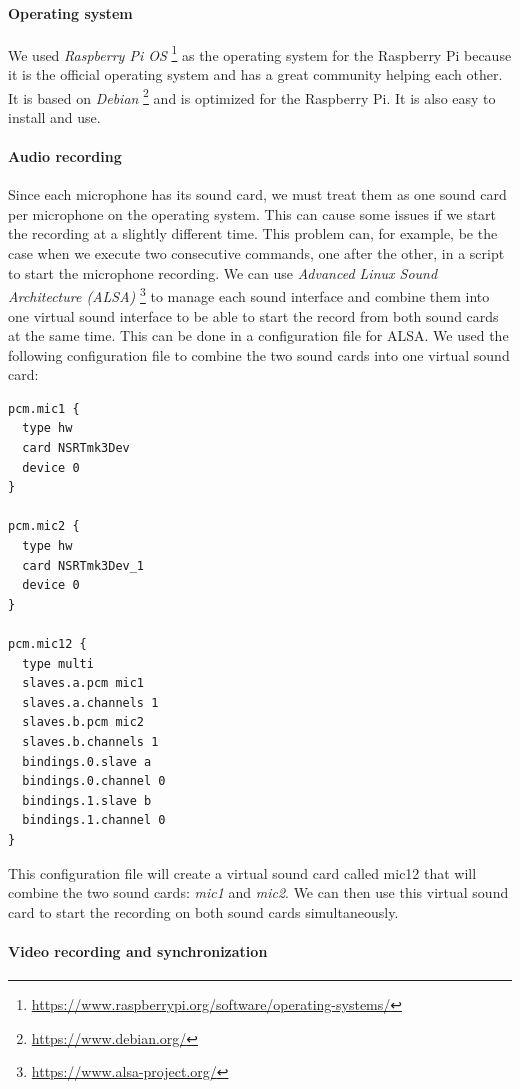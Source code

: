 \paragraph{Operating system}

We used \textit{Raspberry Pi OS} \footnote{\url{https://www.raspberrypi.org/software/operating-systems/}} as the operating system for the Raspberry Pi because it is the official operating system and has a great community helping each other. It is based on \textit{Debian} \footnote{\url{https://www.debian.org/}} and is optimized for the Raspberry Pi. It is also easy to install and use.

\paragraph{Audio recording}

Since each microphone has its sound card, we must treat them as one sound card per microphone on the operating system. This can cause some issues if we start the recording at a slightly different time. This problem can, for example, be the case when we execute two consecutive commands, one after the other, in a script to start the microphone recording. We can use \textit{Advanced Linux Sound Architecture (ALSA)} \footnote{\url{https://www.alsa-project.org/}} to manage each sound interface and combine them into one virtual sound interface to be able to start the record from both sound cards at the same time. This can be done in a configuration file for ALSA. We used the following configuration file to combine the two sound cards into one virtual sound card:

\begin{lstlisting}
pcm.mic1 {
  type hw
  card NSRTmk3Dev
  device 0
}

pcm.mic2 {
  type hw
  card NSRTmk3Dev_1
  device 0
}

pcm.mic12 {
  type multi
  slaves.a.pcm mic1
  slaves.a.channels 1
  slaves.b.pcm mic2
  slaves.b.channels 1
  bindings.0.slave a
  bindings.0.channel 0
  bindings.1.slave b
  bindings.1.channel 0
}
\end{lstlisting}

This configuration file will create a virtual sound card called mic12 that will combine the two sound cards: \textit{mic1} and \textit{mic2}. We can then use this virtual sound card to start the recording on both sound cards simultaneously.

\paragraph{Video recording and synchronization}

